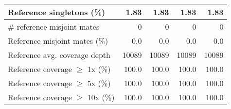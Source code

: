\documentclass[12pt,a4paper]{article}
\begin{document}
\begin{table}[ht]
\begin{center}
\begin{tabular}{|l*{4}{|r}|}
Reference singletons (\%) & 1.83 & 1.83 & 1.83 & 1.83 \\ \hline
\# reference misjoint mates & 0 & 0 & 0 & 0 \\ \hline
Reference misjoint mates (\%) & 0.0 & 0.0 & 0.0 & 0.0 \\ \hline
Reference avg. coverage depth & 10089 & 10089 & 10089 & 10089 \\ \hline
Reference coverage $\geq$ 1x (\%) & 100.0 & 100.0 & 100.0 & 100.0 \\ \hline
Reference coverage $\geq$ 5x (\%) & 100.0 & 100.0 & 100.0 & 100.0 \\ \hline
Reference coverage $\geq$ 10x (\%) & 100.0 & 100.0 & 100.0 & 100.0 \\ \hline
\end{tabular}
\end{center}
\end{table}
\end{document}
